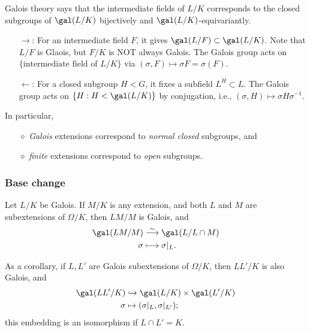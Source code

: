 Galois theory says that the intermediate fields of $L/K$ corresponds to the closed subgroups of $\gal(L/K)$ bijectively and $\gal(L/K)$-equivariantly.
\begin{enumerate}
    \item [$\rightarrow$:] For an intermediate field $F$, it gives $\gal(L/F)\subset \gal(L/K)$. Note that $L/F$ is Glaois, but $F/K$ is NOT always Galois.
    The Galois group acts on $\{\text{intermediate field of } L/K\}$ via $(\sigma, F) \mapsto \sigma F = \sigma(F)$.
    \item [$\leftarrow$:] For a closed subgroup $H < G$, it fixes a subfield $L^H \subset L$. The Galois group acts on $\{H : H < \gal(L/K)\}$ by conjugation, i.e., $(\sigma, H) \mapsto \sigma H\sigma^{-1}$.
\end{enumerate}
In particular,\begin{enumerate}
    \item [$\diamond$] \textit{Galois} extensions correspond to \textit{normal closed} subgroups, and
    \item [$\diamond$] \textit{finite} extensions correspond to \textit{open} subgroups.
\end{enumerate}

\subsubsection*{Base change}
\begin{proposition}\label{field extension base change}
    Let $L/K$ be Galois. If $M/K$ is any extension, and both $L$ and $M$ are subextensions of $\Omega/K$, then $LM/M$ is Galois, and
    \begin{align*}
        \gal(LM/M) &\stackrel{\sim}{\longrightarrow}\gal(L/L\cap M)\\
        \sigma&\longmapsto \sigma|_L.
    \end{align*}
\end{proposition}
As a corollary, if $L, L'$ are Galois subextensions of $\Omega/K$, then $LL'/K$ is also Galois, and \begin{align*}
    \gal(LL'/K)&\hookrightarrow \gal(L/K)\times \gal(L'/K)\\
    \sigma &\mapsto (\sigma|_L, \sigma|_{L'});
\end{align*}
this embedding is an isomorphism if $L\cap L' = K$.




